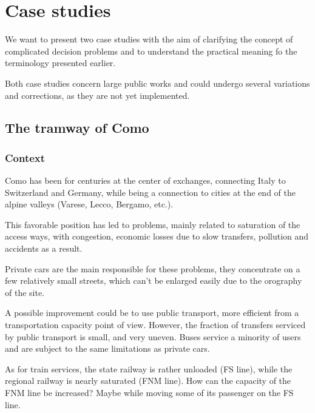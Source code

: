 \chapter{Case studies}
\label{ch:cases}

We want to present two case studies with the aim of clarifying the concept of complicated decision problems and to understand the practical meaning fo the terminology presented earlier. 

Both case studies concern large public works and could undergo several variations and corrections, as they are not yet implemented.

\section{The tramway of Como}
\label{sec:comotram}

\subsection{Context}
\label{subsec:comocontext}

Como has been for centuries at the center of exchanges, connecting Italy to Switzerland and Germany, while being a connection to cities at the end of the alpine valleys (Varese, Lecco, Bergamo, etc.).

This favorable position has led to problems, mainly related to saturation of the access ways, with congestion, economic losses due to slow transfers, pollution and accidents as a result.

Private cars are the main responsible for these problems, they concentrate on a few relatively small streets, which can't be enlarged easily due to the orography of the site.

A possible improvement could be to use public transport, more efficient from a transportation capacity point of view. However, the fraction of transfers serviced by public transport is small, and very uneven. Buses service a minority of users and are subject to the same limitations as private cars. 

As for train services, the state railway is rather unloaded (FS line), while the regional railway is nearly saturated (FNM line). How can the capacity of the FNM line be increased? Maybe while moving some of its passenger on the FS line.

